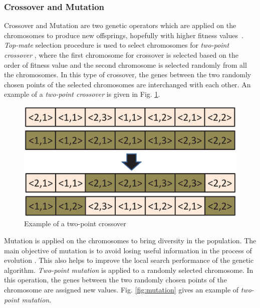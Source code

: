 \documentclass[conference]{IEEEtran}
\begin{document}
\subsubsection{Crossover and Mutation} Crossover and Mutation are two genetic operators which are applied on the chromosomes
to produce new offsprings, hopefully with higher fitness values~\cite{Goldberg}. 
\emph{Top-mate} selection procedure is used to select chromosomes for \emph{two-point crossover} \cite{Goldberg}, where the first chromosome for crossover is selected based on the order of fitness value and the second chromosome is selected randomly from all the chromosomes. In this type of
crossover, the genes between the two randomly chosen points of the selected chromosomes are interchanged with each other. 
An example of a \emph{two-point crossover} %
is given in Fig. \ref{fig:crossover}.

\begin{figure}[h]
	\begin{center}
		\includegraphics[scale=0.35]{crossover.eps}
	\end{center}
		\caption{Example of a two-point crossover}
	\label{fig:crossover}
\end{figure}


Mutation %
is applied on the chromosomes to bring diversity in the population. The main objective of mutation
is to avoid losing useful information in the process of evolution \cite{Goldberg}. This also helps to improve the local search performance
of the genetic algorithm. \emph{Two-point mutation} is applied to a randomly selected chromosome. In this operation, the genes between
the two randomly chosen points of the chromosome are assigned new values. Fig. \ref{fig:mutation} gives an example of  \emph{two-point mutation}. %
\end{document}
